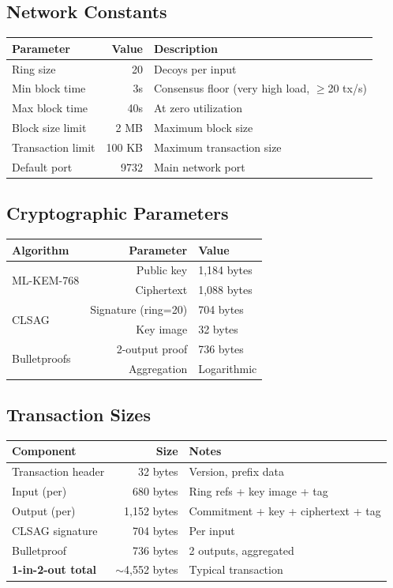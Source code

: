 \subsection{Network Constants}

\begin{tabular}{@{}lrl@{}}
\toprule
\textbf{Parameter} & \textbf{Value} & \textbf{Description} \\
\midrule
Ring size & 20 & Decoys per input \\
Min block time & 3s & Consensus floor (very high load, $\geq$20 tx/s) \\
Max block time & 40s & At zero utilization \\
Block size limit & 2 MB & Maximum block size \\
Transaction limit & 100 KB & Maximum transaction size \\
Default port & 9732 & Main network port \\
\bottomrule
\end{tabular}

\subsection{Cryptographic Parameters}

\begin{tabular}{@{}lrl@{}}
\toprule
\textbf{Algorithm} & \textbf{Parameter} & \textbf{Value} \\
\midrule
\multirow{2}{*}{ML-KEM-768} & Public key & 1,184 bytes \\
 & Ciphertext & 1,088 bytes \\
\midrule
\multirow{2}{*}{CLSAG} & Signature (ring=20) & 704 bytes \\
 & Key image & 32 bytes \\
\midrule
\multirow{2}{*}{Bulletproofs} & 2-output proof & 736 bytes \\
 & Aggregation & Logarithmic \\
\bottomrule
\end{tabular}

\subsection{Transaction Sizes}

\begin{tabular}{@{}lrl@{}}
\toprule
\textbf{Component} & \textbf{Size} & \textbf{Notes} \\
\midrule
Transaction header & 32 bytes & Version, prefix data \\
Input (per) & 680 bytes & Ring refs + key image + tag \\
Output (per) & 1,152 bytes & Commitment + key + ciphertext + tag \\
CLSAG signature & 704 bytes & Per input \\
Bulletproof & 736 bytes & 2 outputs, aggregated \\
\midrule
\textbf{1-in-2-out total} & $\sim$4,552 bytes & Typical transaction \\
\bottomrule
\end{tabular}

